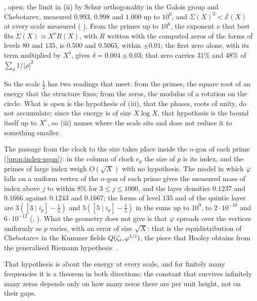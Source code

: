 \begin{proposition}
{, open; the limit in (ii) by Schur orthogonality in the
Galois group and Chebotarev, measured $0.993$, $0.998$ and $1.000$ up to $10^6$, and
$\Sigma(X)^2<\mathcal E(X)$ at every scale measured ( ).  From the primes up to $10^6$, the
exponent $\nu$ that best fits $\Sigma(X)\approx X^\nu R(X)$, with $R$ written with the computed
zeros of the forms of levels $80$ and $135$, is $0.500$ and $0.5065$, within $\pm0.01$; the first
zero alone, with its term multiplied by $X^{\delta}$, gives $\delta=0.004\pm0.03$; that zero carries
$31\%$ and $48\%$ of $\sum_\rho1/|\rho|^2$ \par}
\end{proposition}

So the scale $\tfrac12$ has two readings that meet: from the primes, the square root of an
energy that the structure fixes; from the zeros, the modulus of a rotation on the circle.  What is
open is the hypothesis of (iii), that the phases, roots of unity, do not accumulate; since the
energy is of size $X\log X$, that hypothesis is the bound itself up to $X^\varepsilon$, so (iii)
names where the scale sits and does not reduce it to something smaller.

The passage from the clock to the size takes place inside the $n$-gon of each prime
(\cref{prop:index-ngon}): in the column of
clock $e_p$ the size of $p$ is its index, and the primes of large index weigh $O(\sqrt X)$ with no
hypothesis.  The model in which $\varphi$ falls on a uniform vertex of the $n$-gon of each prime
gives the measured mass of index above $j$ to within $8\%$ for $3\leq j\leq1000$, and the layer
densities $0.1237$ and $0.1666$ against $0.1243$ and $0.1667$; the forms of level $135$ and of the
quintic layer are $3([3\mid i_p]-\tfrac13)$ and $5([5\mid i_p]-\tfrac15)$ in the sums up to $10^9$,
to $2\cdot10^{-10}$ and $6\cdot10^{-12}$ (,
).  What the geometry does not give is that $\varphi$ spreads over
the vertices uniformly as $p$ varies, with an error of size $\sqrt X$: that is the
equidistribution of Chebotarev in the Kummer fields $Q(\zeta_i,\varphi^{1/i})$, the piece that
Hooley obtains from the generalised Riemann hypothesis~\cite{hooley67}.


That hypothesis is about the energy at every scale, and for finitely many frequencies it is a
theorem in both directions; the constant that survives infinitely many zeros depends only on
how many zeros there are per unit height, not on their gaps.


